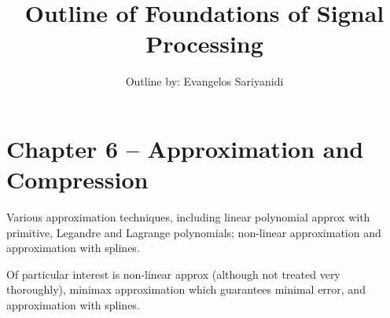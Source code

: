 \documentclass{article}
\begin{document}
\author{Outline by: Evangelos Sariyanidi}

\title{\bf Outline of Foundations of Signal Processing}
\maketitle
\section*{Chapter 6 -- Approximation and Compression}


Various approximation techniques, including linear polynomial approx with primitive, Legandre and Lagrange polynomials; non-linear approximation and approximation with splines.

Of particular interest is non-linear approx (although not treated very thoroughly), minimax approximation which guarantees minimal error, and approximation with splines. 
\end{document}
